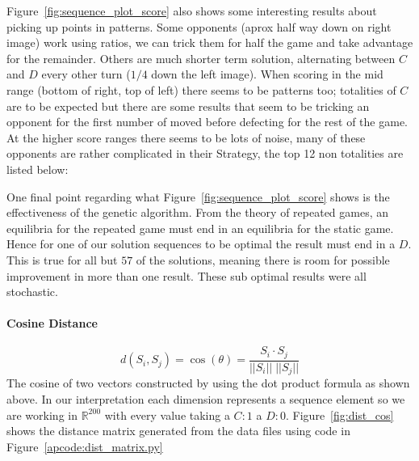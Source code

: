 Figure~\ref{fig:sequence_plot_score} also shows some interesting results about picking up points in patterns.
Some opponents (aprox half way down on right image) work using ratios, we can trick them for half the game and take advantage for the remainder.
Others are much shorter term solution, alternating between $C$ and $D$ every other turn ($1/4$ down the left image).
When scoring in the mid range (bottom of right, top of left) there seems to be patterns too; totalities of $C$ are to be expected but there are some results that seem to be tricking an opponent for the first number of moved before defecting for the rest of the game.
At the higher score ranges there seems to be lots of noise, many of these opponents are rather complicated in their Strategy, the top 12 non totalities are listed below:

One final point regarding what Figure~\ref{fig:sequence_plot_score} shows is the effectiveness of the genetic algorithm.
From the theory of repeated games, an equilibria for the repeated game must end in an equilibria for the static game.
Hence for one of our solution sequences to be optimal the result must end in a $D$. 
This is true for all but $57$ of the solutions, meaning there is room for possible improvement in more than one result.
These sub optimal results were all stochastic.

\paragraph{Cosine Distance}\cite{bora2014effect}
$$ d(S_i,S_j) = \cos(\theta) = \frac{{S_i} \cdot {S_j}}{|| {S_i} || \; || {S_j} ||} $$
The cosine of two vectors constructed by using the dot product formula as shown above.
In our interpretation each dimension represents a sequence element so we are working in $\mathbb{R}^{200}$ with every value taking a $C:1$ a $D:0$.
Figure~\ref{fig:dist_cos} shows the distance matrix generated from the data files using code in Figure~\ref{apcode:dist_matrix.py}


